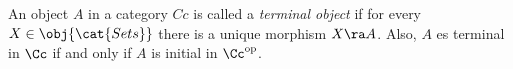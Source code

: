 \begin{defin*}
  An object $A$ in a category $Cc$ is called a \emph{terminal object} if for every
  $X\in\obj{\cat{Sets}}$ there is a unique morphism $X\ra A$. Also, $A$ es terminal in $\Cc$ if
  and only if $A$ is initial in $\Cc^{\text{op}}$.
\end{defin*}
